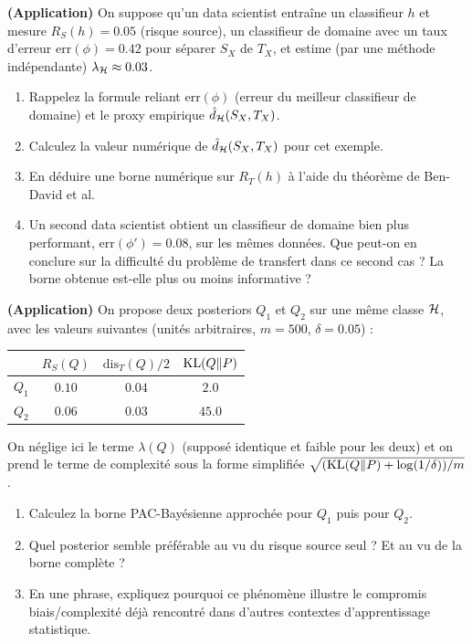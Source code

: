 \documentclass[11pt]{article}
\begin{document}
\begin{exercise} \textbf{(Application)}
On suppose qu'un data scientist entraîne un classifieur $h$ et mesure $R_S(h) = 0.05$ (risque source),
un classifieur de domaine avec un taux d'erreur $\mathrm{err}(\phi)=0.42$ pour séparer $S_X$ de $T_X$, et
estime (par une méthode indépendante) $\lambda_{\mathcal{H}} \approx 0.03$.
\begin{enumerate}[label=(\alph*)]
\item Rappelez la formule reliant $\mathrm{err}(\phi)$ (erreur du meilleur classifieur de domaine) et le
proxy empirique $\hat d_{\mathcal{H}}(S_X,T_X)$.
\item Calculez la valeur numérique de $\hat d_{\mathcal{H}}(S_X,T_X)$ pour cet exemple.
\item En déduire une borne numérique sur $R_T(h)$ à l'aide du théorème de Ben-David et al.
\item Un second data scientist obtient un classifieur de domaine bien plus performant,
$\mathrm{err}(\phi')=0.08$, sur les mêmes données. Que peut-on en conclure sur la difficulté du problème
de transfert dans ce second cas ? La borne obtenue est-elle plus ou moins informative ?
\end{enumerate}
\end{exercise}

\begin{exercise} \textbf{(Application)}
On propose deux posteriors $Q_1$ et $Q_2$ sur une même classe $\mathcal{H}$, avec les valeurs suivantes (unités
arbitraires, $m=500$, $\delta=0.05$) :
\begin{center}
\begin{tabular}{lccc}
\toprule
& $R_S(Q)$ & $\mathrm{dis}_T(Q)/2$ & $\operatorname{KL}(Q\|P)$ \\
\midrule
$Q_1$ & $0.10$ & $0.04$ & $2.0$ \\
$Q_2$ & $0.06$ & $0.03$ & $45.0$ \\
\bottomrule
\end{tabular}
\end{center}
On néglige ici le terme $\lambda(Q)$ (supposé identique et faible pour les deux) et on prend le terme de
complexité sous la forme simplifiée $\sqrt{(\operatorname{KL}(Q\|P)+\log(1/\delta))/m}$.
\begin{enumerate}[label=(\alph*)]
\item Calculez la borne PAC-Bayésienne approchée pour $Q_1$ puis pour $Q_2$.
\item Quel posterior semble préférable au vu du risque source seul ? Et au vu de la borne complète ?
\item En une phrase, expliquez pourquoi ce phénomène illustre le compromis biais/complexité déjà rencontré
dans d'autres contextes d'apprentissage statistique.
\end{enumerate}
\end{exercise}
\end{document}
